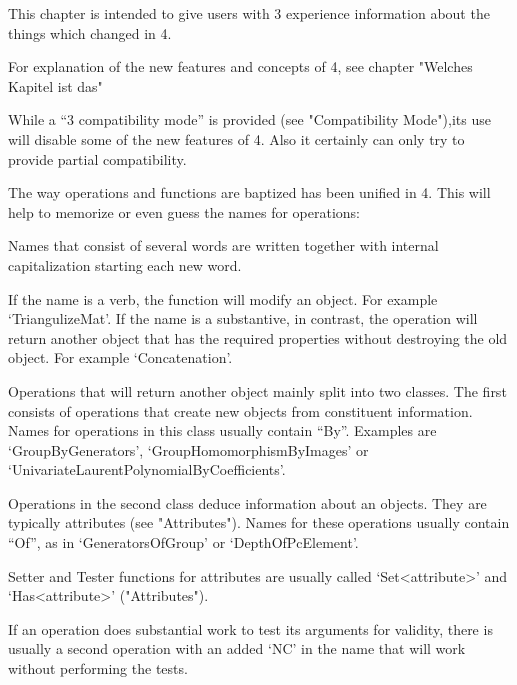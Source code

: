 

This chapter is intended to give users with {\GAP}3 experience
information about the things which changed in {\GAP}4.

For explanation of the new features and concepts of {\GAP}4, see chapter
"Welches Kapitel ist das"

While a ``{\GAP}3 compatibility mode'' is provided (see "Compatibility
Mode"),its use will disable some of the new features of {\GAP}4. Also it
certainly can only try to provide partial compatibility.



The way operations and functions are baptized has been unified in {\GAP}4.
This will help to memorize or even guess the names for operations:

Names that consist of several words are written together with internal
capitalization starting each new word.

If the name is a verb, the function will modify an object. For example
`TriangulizeMat'. If the name is a substantive, in contrast, the operation
will return another object that has the required properties without
destroying the old object. For example `Concatenation'.

Operations that will return another object mainly split into two classes.
The first consists of operations that create new objects from
constituent information. Names for operations
in this class usually contain ``By''. Examples are `GroupByGenerators',
`GroupHomomorphismByImages' or `UnivariateLaurentPolynomialByCoefficients'.

Operations in the second class deduce information about an objects. They are
typically attributes (see "Attributes"). Names for these operations usually
contain ``Of'', as in `GeneratorsOfGroup' or `DepthOfPcElement'.

Setter and Tester functions for attributes are usually called
`Set<attribute>' and `Has<attribute>' ("Attributes").

If an operation does substantial work to test its arguments for validity,
there is  usually a second operation with an added `NC' in the name that
will work without performing the tests.

